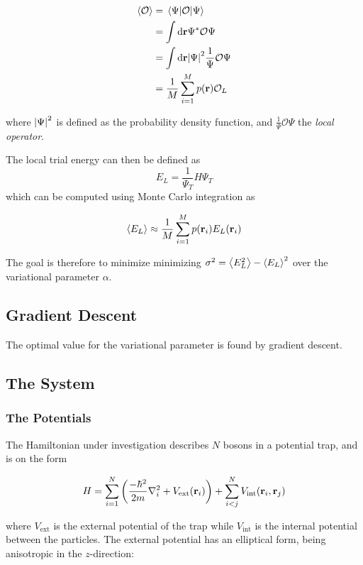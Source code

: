 \begin{align*}
  \expval{\mathcal{O}} &= \ev{\mathcal{O}}{\Psi}\\
                       &= \int \dd \vb{r} \Psi^{*}\mathcal{O}\Psi \\
                       &= \int \dd \vb{r} \abs{\Psi}^{2} \frac{1}{\Psi}\mathcal{O}\Psi\\
  &= \frac{1}{M} \sum_{i=1}^{M}p(\vb{r})\mathcal{O}_{L}
\end{align*}

where \(\abs{\Psi}^{2}\) is defined as the probability density function, and
\(\frac{1}{\Psi}\mathcal{O}\Psi\) the \textit{local operator}.

The local trial energy can then be defined as
\begin{equation*}
  E_{L} =\frac{1}{\Psi_{T}}H\Psi_{T}
\end{equation*}
which can be computed using Monte Carlo integration as

\begin{align*}
  \expval{E_{L}} \approx \frac{1}{M}\sum_{i=1}^{M} p(\vb{r}_{i})E_{L}(\vb{r}_{i})
\end{align*}

The goal is therefore to minimize minimizing \(\sigma^{2} = \expval{E_{L}^{2}} -
\expval{E_{L}}^{2}\) over the variational parameter \(\alpha\).

\subsection{Gradient Descent}
The optimal value for the variational parameter is found by gradient descent.

\subsection{The System}
\subsubsection{The Potentials}

The Hamiltonian under investigation describes \(N\) bosons in a potential trap,
and is on the form

\begin{equation*}
  H = \sum_{i=1}^{N}\left( \frac{-\hbar^{2}}{2m}\nabla^{2}_{i} + V_{\text{ext}}(\vb{r}_{i})\right) + \sum_{i<j}^{N}V_{\text{int}}(\vb{r}_{i}, \vb{r}_{j})
\end{equation*}

where \(V_{\text{ext}}\) is the external potential of the trap while
\(V_{\text{int}}\) is the internal potential between the particles. 
The external potential has an elliptical form, being anisotropic in the \(z\)-direction:

